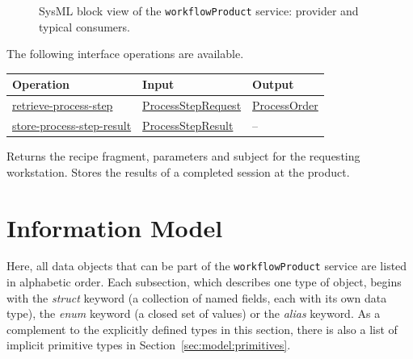 \documentclass[a4paper]{arrowhead}
\newcommand{\mref}[1]{{\textcolor{ArrowheadPurple}{\hyperref[sec:model:#1]{#1}}}}
\newcommand{\oref}[1]{{\textcolor{ArrowheadBlue}{\hyperref[sec:operations:#1]{#1}}}}
\begin{document}
\begin{figure}[ht!]
  \centering
  \caption{SysML block view of the \texttt{workflowProduct} service: provider and typical consumers.}
  \label{fig:SD}
\end{figure}

The following interface operations are available.

{\small
\begin{longtable}{|p{4.4cm}|p{5.6cm}|p{5.8cm}|}

\hline
\rowcolor{gray!33} Operation & Input & Output \\ \hline
\endhead
\oref{retrieve-process-step} & \mref{ProcessStepRequest} & \mref{ProcessOrder} \\ \hline
\oref{store-process-step-result} & \mref{ProcessStepResult} & -- \\ \hline
\end{longtable}
}

Returns the recipe fragment, parameters and subject for the requesting workstation.
Stores the results of a completed session at the product.

\newpage
\section{Information Model}
\label{sec:model}
Here, all data objects that can be part of the \texttt{workflowProduct} service are listed in alphabetic order. Each
subsection, which describes one type of object, begins with the \textit{struct} keyword (a collection of named fields,
each with its own data type), the \textit{enum} keyword (a closed set of values) or the \textit{alias} keyword. As a
complement to the explicitly defined types in this section, there is also a list of implicit primitive types in
Section~\ref{sec:model:primitives}.
\end{document}
